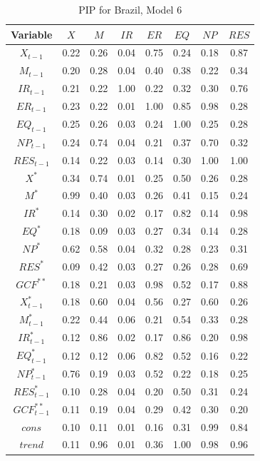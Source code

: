 \documentclass[a4paper, twoside]{templates/ociamthesis}
\begin{document}
\begin{table}[!ht]

\caption{\label{tab:TablePIPBR6}PIP for Brazil, Model 6}
\centering
\fontsize{8}{10}\selectfont
\begin{tabular}[t]{cccccccc}
\toprule
Variable & $X$ & $M$ & $IR$ & $ER$ & $EQ$ & $NP$ & $RES$\\
\midrule
$X_{t-1}$ & 0.22 & 0.26 & 0.04 & 0.75 & 0.24 & 0.18 & 0.87\\
$M_{t-1}$ & 0.20 & 0.28 & 0.04 & 0.40 & 0.38 & 0.22 & 0.34\\
$IR_{t-1}$ & 0.21 & 0.22 & 1.00 & 0.22 & 0.32 & 0.30 & 0.76\\
$ER_{t-1}$ & 0.23 & 0.22 & 0.01 & 1.00 & 0.85 & 0.98 & 0.28\\
$EQ_{t-1}$ & 0.25 & 0.26 & 0.03 & 0.24 & 1.00 & 0.25 & 0.28\\
$NP_{t-1}$ & 0.24 & 0.74 & 0.04 & 0.21 & 0.37 & 0.70 & 0.32\\
$RES_{t-1}$ & 0.14 & 0.22 & 0.03 & 0.14 & 0.30 & 1.00 & 1.00\\
$X^*$ & 0.34 & 0.74 & 0.01 & 0.25 & 0.50 & 0.26 & 0.28\\
$M^*$ & 0.99 & 0.40 & 0.03 & 0.26 & 0.41 & 0.15 & 0.24\\
$IR^*$ & 0.14 & 0.30 & 0.02 & 0.17 & 0.82 & 0.14 & 0.98\\
$EQ^*$ & 0.18 & 0.09 & 0.03 & 0.27 & 0.34 & 0.14 & 0.28\\
$NP^*$ & 0.62 & 0.58 & 0.04 & 0.32 & 0.28 & 0.23 & 0.31\\
$RES^*$ & 0.09 & 0.42 & 0.03 & 0.27 & 0.26 & 0.28 & 0.69\\
$GCF^{**}$ & 0.18 & 0.21 & 0.03 & 0.98 & 0.52 & 0.17 & 0.88\\
$X^*_{t-1}$ & 0.18 & 0.60 & 0.04 & 0.56 & 0.27 & 0.60 & 0.26\\
$M^*_{t-1}$ & 0.22 & 0.44 & 0.06 & 0.21 & 0.54 & 0.33 & 0.28\\
$IR^*_{t-1}$ & 0.12 & 0.86 & 0.02 & 0.17 & 0.86 & 0.20 & 0.98\\
$EQ^*_{t-1}$ & 0.12 & 0.12 & 0.06 & 0.82 & 0.52 & 0.16 & 0.22\\
$NP^*_{t-1}$ & 0.76 & 0.19 & 0.03 & 0.52 & 0.22 & 0.18 & 0.25\\
$RES^*_{t-1}$ & 0.10 & 0.28 & 0.04 & 0.20 & 0.50 & 0.31 & 0.24\\
$GCF^{**}_{t-1}$ & 0.11 & 0.19 & 0.04 & 0.29 & 0.42 & 0.30 & 0.20\\
$cons$ & 0.10 & 0.11 & 0.01 & 0.16 & 0.31 & 0.99 & 0.84\\
$trend$ & 0.11 & 0.96 & 0.01 & 0.36 & 1.00 & 0.98 & 0.96\\
\bottomrule
\end{tabular}
\end{table}
\end{document}
